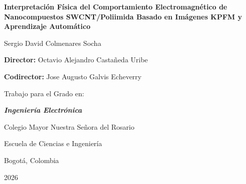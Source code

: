 \newpage
\pagestyle{empty}
\mbox{}
\newpage

\begin{titlepage}
    \centering
    {\huge \textbf{Interpretación Física del Comportamiento Electromagnético de Nanocompuestos SWCNT/Poliimida Basado en Imágenes KPFM y Aprendizaje Automático} \par}
    \vspace{4.5 cm}
    {\huge Sergio David Colmenares Socha \par}
    \vspace{.2 cm}
    {\large \textbf{Director:} Octavio Alejandro Castañeda Uribe \par}
    
    {\large \textbf{Codirector:} Jose Augusto Galvis Echeverry \par}
    \vspace{3.5 cm}
    
    {\large Trabajo para el Grado en: \par}
    
    {\Large \textbf{\textit{Ingeniería Electrónica}} \par}
    \vspace{1 cm}
    \vfill
    
    {\large Colegio Mayor Nuestra Señora del Rosario \par}

    {\large Escuela de Ciencias e Ingeniería \par}
    
    
    {\large Bogotá, Colombia \par}
    {\large 2026 \par}
\end{titlepage}


\newpage
\pagestyle{empty}
\mbox{}
\newpage


